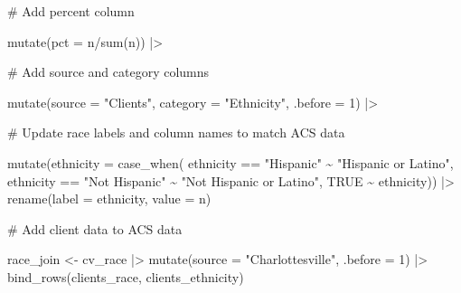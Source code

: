 \documentclass[
  letterpaper,
  DIV=11,
  numbers=noendperiod]{scrartcl}
\newenvironment{Shaded}{\begin{snugshade}}{\end{snugshade}}
\newcommand{\AttributeTok}[1]{\textcolor[rgb]{0.40,0.45,0.13}{#1}}
\newcommand{\CommentTok}[1]{\textcolor[rgb]{0.37,0.37,0.37}{#1}}
\newcommand{\ConstantTok}[1]{\textcolor[rgb]{0.56,0.35,0.01}{#1}}
\newcommand{\DecValTok}[1]{\textcolor[rgb]{0.68,0.00,0.00}{#1}}
\newcommand{\FunctionTok}[1]{\textcolor[rgb]{0.28,0.35,0.67}{#1}}
\newcommand{\NormalTok}[1]{\textcolor[rgb]{0.00,0.23,0.31}{#1}}
\newcommand{\OtherTok}[1]{\textcolor[rgb]{0.00,0.23,0.31}{#1}}
\newcommand{\SpecialCharTok}[1]{\textcolor[rgb]{0.37,0.37,0.37}{#1}}
\newcommand{\StringTok}[1]{\textcolor[rgb]{0.13,0.47,0.30}{#1}}
\begin{document}
\begin{Shaded}
\begin{Highlighting}[]
  \CommentTok{\# Add percent column}
  
  \FunctionTok{mutate}\NormalTok{(}\AttributeTok{pct =}\NormalTok{ n}\SpecialCharTok{/}\FunctionTok{sum}\NormalTok{(n)) }\SpecialCharTok{|\textgreater{}} 
  
  \CommentTok{\# Add source and category columns}
  
  \FunctionTok{mutate}\NormalTok{(}\AttributeTok{source =} \StringTok{"Clients"}\NormalTok{,}
         \AttributeTok{category =} \StringTok{"Ethnicity"}\NormalTok{,}
         \AttributeTok{.before =} \DecValTok{1}\NormalTok{) }\SpecialCharTok{|\textgreater{}} 
  
  \CommentTok{\# Update race labels and column names to match ACS data}
  
  \FunctionTok{mutate}\NormalTok{(}\AttributeTok{ethnicity =} \FunctionTok{case\_when}\NormalTok{(}
\NormalTok{    ethnicity }\SpecialCharTok{==} \StringTok{"Hispanic"} \SpecialCharTok{\textasciitilde{}} \StringTok{"Hispanic or Latino"}\NormalTok{,}
\NormalTok{    ethnicity }\SpecialCharTok{==} \StringTok{"Not Hispanic"} \SpecialCharTok{\textasciitilde{}} \StringTok{"Not Hispanic or Latino"}\NormalTok{,}
    \ConstantTok{TRUE} \SpecialCharTok{\textasciitilde{}}\NormalTok{ ethnicity)) }\SpecialCharTok{|\textgreater{}} 
  \FunctionTok{rename}\NormalTok{(}\AttributeTok{label =}\NormalTok{ ethnicity,}
         \AttributeTok{value =}\NormalTok{ n)}

\CommentTok{\# Add client data to ACS data}

\NormalTok{race\_join }\OtherTok{\textless{}{-}}\NormalTok{ cv\_race }\SpecialCharTok{|\textgreater{}} 
  \FunctionTok{mutate}\NormalTok{(}\AttributeTok{source =} \StringTok{"Charlottesville"}\NormalTok{, }\AttributeTok{.before =} \DecValTok{1}\NormalTok{) }\SpecialCharTok{|\textgreater{}} 
  \FunctionTok{bind\_rows}\NormalTok{(clients\_race, clients\_ethnicity)}


\end{Highlighting}
\end{Shaded}
\end{document}
